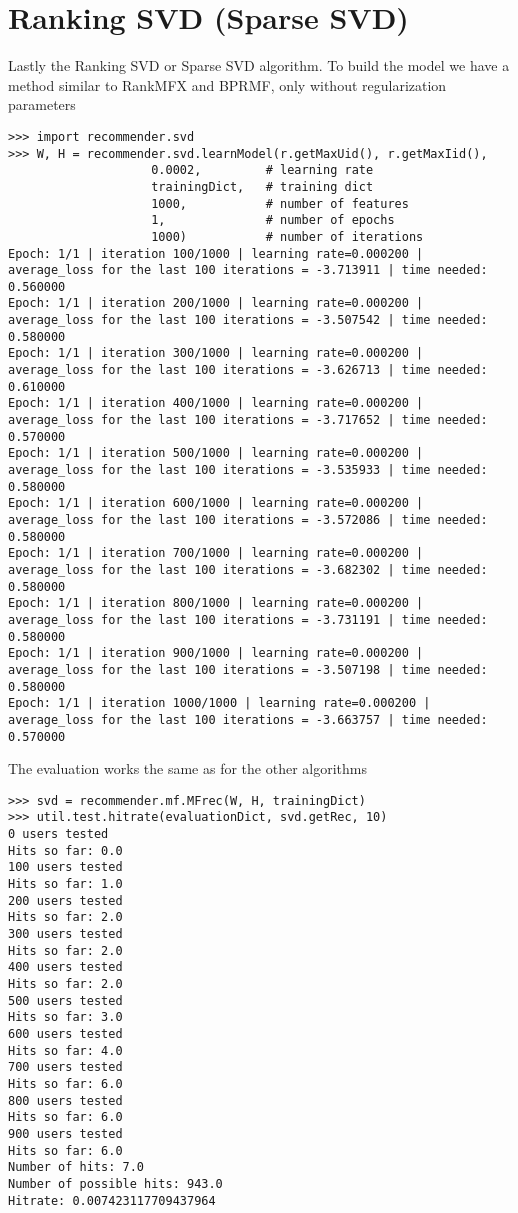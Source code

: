 \section{Ranking SVD (Sparse SVD)}
Lastly the Ranking SVD or Sparse SVD algorithm. To build the model we have 
a method similar to RankMFX and BPRMF, only without regularization parameters
\begin{lstlisting}
>>> import recommender.svd
>>> W, H = recommender.svd.learnModel(r.getMaxUid(), r.getMaxIid(),
                    0.0002,         # learning rate
                    trainingDict,   # training dict
                    1000,           # number of features
                    1,              # number of epochs
                    1000)           # number of iterations
Epoch: 1/1 | iteration 100/1000 | learning rate=0.000200 | average_loss for the last 100 iterations = -3.713911 | time needed: 0.560000
Epoch: 1/1 | iteration 200/1000 | learning rate=0.000200 | average_loss for the last 100 iterations = -3.507542 | time needed: 0.580000
Epoch: 1/1 | iteration 300/1000 | learning rate=0.000200 | average_loss for the last 100 iterations = -3.626713 | time needed: 0.610000
Epoch: 1/1 | iteration 400/1000 | learning rate=0.000200 | average_loss for the last 100 iterations = -3.717652 | time needed: 0.570000
Epoch: 1/1 | iteration 500/1000 | learning rate=0.000200 | average_loss for the last 100 iterations = -3.535933 | time needed: 0.580000
Epoch: 1/1 | iteration 600/1000 | learning rate=0.000200 | average_loss for the last 100 iterations = -3.572086 | time needed: 0.580000
Epoch: 1/1 | iteration 700/1000 | learning rate=0.000200 | average_loss for the last 100 iterations = -3.682302 | time needed: 0.580000
Epoch: 1/1 | iteration 800/1000 | learning rate=0.000200 | average_loss for the last 100 iterations = -3.731191 | time needed: 0.580000
Epoch: 1/1 | iteration 900/1000 | learning rate=0.000200 | average_loss for the last 100 iterations = -3.507198 | time needed: 0.580000
Epoch: 1/1 | iteration 1000/1000 | learning rate=0.000200 | average_loss for the last 100 iterations = -3.663757 | time needed: 0.570000
\end{lstlisting}
The evaluation works the same as for the other algorithms
\begin{lstlisting}
>>> svd = recommender.mf.MFrec(W, H, trainingDict)
>>> util.test.hitrate(evaluationDict, svd.getRec, 10)
0 users tested
Hits so far: 0.0
100 users tested
Hits so far: 1.0
200 users tested
Hits so far: 2.0
300 users tested
Hits so far: 2.0
400 users tested
Hits so far: 2.0
500 users tested
Hits so far: 3.0
600 users tested
Hits so far: 4.0
700 users tested
Hits so far: 6.0
800 users tested
Hits so far: 6.0
900 users tested
Hits so far: 6.0
Number of hits: 7.0
Number of possible hits: 943.0
Hitrate: 0.007423117709437964
\end{lstlisting}
